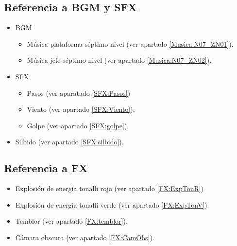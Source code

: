 	\subsection{Referencia a BGM y SFX}
	\begin{itemize}
		\item BGM
			\begin{itemize}
				\item Música plataforma séptimo nivel (ver apartado \ref{Musica:N07_ZN01}).
				\item Música jefe séptimo nivel (ver apartado \ref{Musica:N07_ZN02}).
			\end{itemize}
		\item SFX
			\begin{itemize}
				\item Pasos (ver aparatado \ref{SFX:Pasos})
				\item Viento (ver apartado \ref{SFX:Viento}).
				\item Golpe (ver apartado \ref{SFX:golpe}).
			\end{itemize}
			\item Silbido (ver apartado \ref{SFX:silbido}).
	\end{itemize}
	\subsection{Referencia a FX}
	\begin{itemize}
		\item Explosión de energía tonalli rojo (ver apartado \ref{FX:ExpTonR})
	\item Explosión de energía tonalli verde (ver apartado \ref{FX:ExpTonV})
	\item Temblor (ver apartado \ref{FX:temblor}).
	\item Cámara obscura (ver apartado \ref{FX:CamObs}).
	\end{itemize}
	